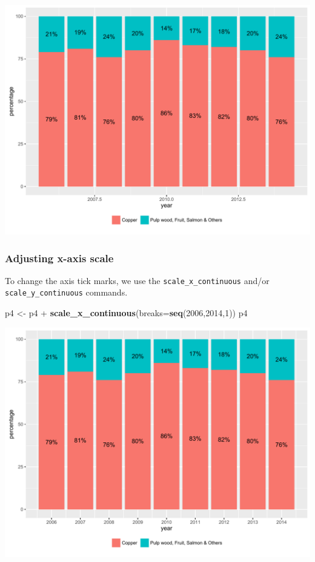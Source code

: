 \documentclass[]{article}
\newenvironment{Shaded}{\begin{snugshade}}{\end{snugshade}}
\newcommand{\KeywordTok}[1]{\textcolor[rgb]{0.13,0.29,0.53}{\textbf{{#1}}}}
\newcommand{\DataTypeTok}[1]{\textcolor[rgb]{0.13,0.29,0.53}{{#1}}}
\newcommand{\DecValTok}[1]{\textcolor[rgb]{0.00,0.00,0.81}{{#1}}}
\newcommand{\StringTok}[1]{\textcolor[rgb]{0.31,0.60,0.02}{{#1}}}
\newcommand{\NormalTok}[1]{{#1}}
\begin{document}
\begin{center}\includegraphics{0_all_posts_pdf/stacked_5-1} \end{center}

\subsubsection{Adjusting x-axis scale}\label{adjusting-x-axis-scale-3}

To change the axis tick marks, we use the \texttt{scale\_x\_continuous}
and/or \texttt{scale\_y\_continuous} commands.

\begin{Shaded}
\begin{Highlighting}[]
\NormalTok{p4 <-}\StringTok{ }\NormalTok{p4 +}\StringTok{ }\KeywordTok{scale_x_continuous}\NormalTok{(}\DataTypeTok{breaks=}\KeywordTok{seq}\NormalTok{(}\DecValTok{2006}\NormalTok{,}\DecValTok{2014}\NormalTok{,}\DecValTok{1}\NormalTok{))}
\NormalTok{p4}
\end{Highlighting}
\end{Shaded}

\begin{center}\includegraphics{0_all_posts_pdf/stacked_6-1} \end{center}
\end{document}
